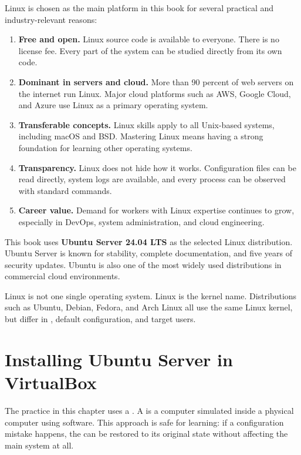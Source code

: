 Linux is chosen as the main platform in this book for several practical and industry-relevant reasons:

\begin{enumerate}
    \item \textbf{Free and open.} Linux source code is available to everyone. There is no license fee. Every part of the system can be studied directly from its own code.

    \item \textbf{Dominant in servers and cloud.} More than 90 percent of web servers on the internet run Linux. Major cloud platforms such as AWS, Google Cloud, and Azure use Linux as a primary operating system.

    \item \textbf{Transferable concepts.} Linux skills apply to all Unix-based systems, including macOS and BSD. Mastering Linux means having a strong foundation for learning other operating systems.

    \item \textbf{Transparency.} Linux does not hide how it works. Configuration files can be read directly, system logs are available, and every process can be observed with standard commands.

    \item \textbf{Career value.} Demand for workers with Linux expertise continues to grow, especially in DevOps, system administration, and cloud engineering.
\end{enumerate}

This book uses \textbf{Ubuntu Server 24.04 LTS} as the selected Linux distribution. Ubuntu Server is known for stability, complete documentation, and five years of security updates. Ubuntu is also one of the most widely used distributions in commercial cloud environments.

\begin{notebox}
Linux is not one single operating system. Linux is the kernel name. Distributions such as Ubuntu, Debian, Fedora, and Arch Linux all use the same Linux kernel, but differ in , default configuration, and target users.
\end{notebox}

\section{Installing Ubuntu Server in VirtualBox}
\label{sec:installation}

The practice in this chapter uses a \textbf{}. A  is a computer simulated inside a physical computer using software. This approach is safe for learning: if a configuration mistake happens, the  can be restored to its original state without affecting the main system at all.

